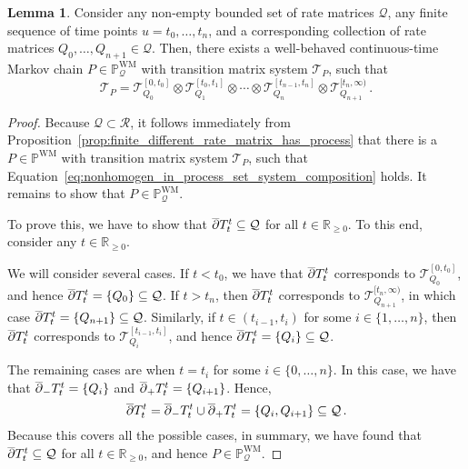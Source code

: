 \documentclass[10pt]{paper}
\theoremstyle{definition}
\newtheorem{lemma}[theorem]{Lemma}
\newcommand{\reals}{\mathbb{R}}
\newcommand{\realsnonneg}{\reals_{\geq 0}}
\newcommand{\processes}{\mathbb{P}}
\newcommand{\wmprocesses}{\processes^{\mathrm{WM}}}
\newcommand{\rateset}{\mathcal{Q}}
\begin{document}
\begin{lemma}\label{lemma:nonhomogeneous_in_process_set}
Consider any non-empty bounded set of rate matrices $\rateset$, any finite sequence of time points $u=t_0,\ldots,t_n$, and a corresponding collection of rate matrices $Q_0,\ldots,Q_{n+1}\in\rateset$. Then, there exists a well-behaved continuous-time Markov chain $P\in\wmprocesses_\rateset$ with transition matrix system $\mathcal{T}_P$, such that
\begin{equation}\label{eq:nonhomogen_in_process_set_system_composition}
\mathcal{T}_P = \mathcal{T}_{Q_0}^{[0,t_0]}\otimes \mathcal{T}_{Q_1}^{[t_0,t_1]} \otimes \cdots \otimes \mathcal{T}_{Q_n}^{[t_{n-1},t_n]} \otimes \mathcal{T}_{Q_{n+1}}^{[t_n,\infty)}\,.
\end{equation}
\end{lemma}
\begin{proof}
Because $\rateset\subset\mathcal{R}$, it follows immediately from Proposition~\ref{prop:finite_different_rate_matrix_has_process} that there is a $P\in\wmprocesses$ with transition matrix system $\mathcal{T}_P$, such that Equation~\eqref{eq:nonhomogen_in_process_set_system_composition} holds. It remains to show that $P\in\wmprocesses_\rateset$.

To prove this, we have to show that $\smash{\overline{\partial}}T_t^t\subseteq\rateset$ for all $t\in\realsnonneg$. To this end, consider any $t\in\realsnonneg$.

We will consider several cases. If $t<t_0$, we have that $\smash{\overline{\partial}}T_t^t$ corresponds to $\mathcal{T}_{Q_0}^{[0,t_0]}$, and hence $\smash{\overline{\partial}}T_t^t=\{Q_0\}\subseteq\rateset$. If $t>t_n$, then $\smash{\overline{\partial}}T_t^t$ corresponds to $\mathcal{T}_{Q_{n+1}}^{[t_n,\infty)}$, in which case $\smash{\overline{\partial}}T_t^t=\{Q_{n+1}\}\subseteq\rateset$. Similarly, if $t\in(t_{i-1},t_i)$ for some $i\in\{1,\ldots,n\}$, then $\smash{\overline{\partial}}T_t^t$ corresponds to $\mathcal{T}_{Q_i}^{[t_{i-1},t_i]}$, and hence $\smash{\overline{\partial}}T_t^t=\{Q_i\}\subseteq\rateset$.

The remaining cases are when $t=t_i$ for some $i\in\{0,\ldots,n\}$. In this case, we have that $\smash{\overline{\partial}}_-T_t^t=\{Q_i\}$ and $\smash{\overline{\partial}}_+T_t^t=\{Q_{i+1}\}$. Hence,
\begin{equation*}
\smash{\overline{\partial}}T_t^t = \smash{\overline{\partial}}_-T_t^t\cup\smash{\overline{\partial}}_+T_t^t=\{Q_{i},Q_{i+1}\}\subseteq\rateset\,.
\end{equation*}
Because this covers all the possible cases, in summary, we have found that $\smash{\overline{\partial}}T_t^t\subseteq\rateset$ for all $t\in\realsnonneg$, and hence $P\in\wmprocesses_\rateset$.
\end{proof}
\end{document}
